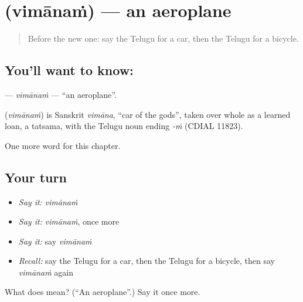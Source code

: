 \section[\texorpdfstring{\te{విమానం} (vimānaṁ)}{విమానం (vimānaṁ)}]{ (vimānaṁ) — an aeroplane}

\label{lesson:TE-C134-vimanam}



\begin{quote}
Before the new one: say the Telugu for a car, then the Telugu for a bicycle.
\end{quote}

\subsection*{You'll want to know: }
\textbf{} — \emph{vimānaṁ} — \textquotedblleft{}an aeroplane\textquotedblright{}.

\begin{cousinweb}
\textbf{} (\emph{vimānaṁ}) is Sanskrit \emph{vimāna}, \textquotedblleft{}car of the gods\textquotedblright{}, taken over whole as a learned loan, a tatsama, with the Telugu noun ending \emph{-ṁ} (CDIAL 11823).
\end{cousinweb}

\begin{grammarlens}[title={What you've built}]
One more word for this chapter.
\end{grammarlens}

\subsection*{Your turn}
\begin{itemize}
\raggedright
  \item \emph{Say it:} \emph{vimānaṁ}
  \item \emph{Say it:} \emph{vimānaṁ}, once more
  \item \emph{Say it:} say \emph{vimānaṁ}
  \item \emph{Recall:} say the Telugu for a car, then the Telugu for a bicycle, then say \emph{vimānaṁ} again
\end{itemize}

\begin{tcolorbox}[breakable,colback=teal!4,colframe=teal!35!black,title={Before you move on}]
What does  mean? (\textquotedblleft{}An aeroplane\textquotedblright{}.) Say it once more.
\end{tcolorbox}

